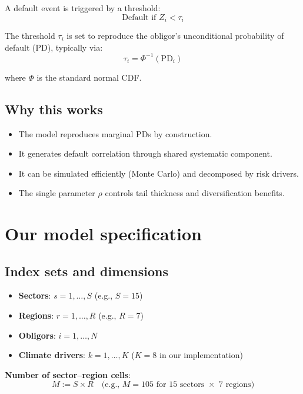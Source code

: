 \documentclass[11pt,a4paper]{article}
\begin{document}
A default event is triggered by a threshold:
\begin{equation}
\text{Default if } Z_i < \tau_i
\end{equation}

The threshold $\tau_i$ is set to reproduce the obligor's unconditional probability of default (PD), typically via:
\begin{equation}
\tau_i = \Phi^{-1}(\text{PD}_i)
\end{equation}

where $\Phi$ is the standard normal CDF.

\subsection{Why this works}

\begin{itemize}
    \item The model reproduces marginal PDs by construction.
    \item It generates default correlation through shared systematic component.
    \item It can be simulated efficiently (Monte Carlo) and decomposed by risk drivers.
    \item The single parameter $\rho$ controls tail thickness and diversification benefits.
\end{itemize}

\section{Our model specification}

\subsection{Index sets and dimensions}

\begin{itemize}
    \item \textbf{Sectors}: $s = 1,\ldots,S$ (e.g., $S=15$)
    \item \textbf{Regions}: $r = 1,\ldots,R$ (e.g., $R=7$)
    \item \textbf{Obligors}: $i = 1,\ldots,N$
    \item \textbf{Climate drivers}: $k = 1,\ldots,K$ ($K=8$ in our implementation)
\end{itemize}

\textbf{Number of sector--region cells}:
\begin{equation}
M := S \times R \quad \text{(e.g., } M = 105 \text{ for 15 sectors } \times \text{ 7 regions)}
\end{equation}
\end{document}
